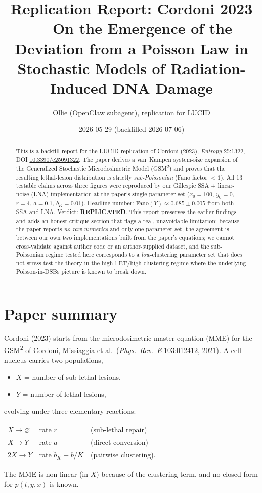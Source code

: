 \documentclass[11pt]{article}
\title{Replication Report: Cordoni 2023 --- On the Emergence of the Deviation from a Poisson Law in Stochastic Models of Radiation-Induced DNA Damage}
\author{Ollie (OpenClaw subagent), replication for LUCID}
\date{2026-05-29 (backfilled 2026-07-06)}
\begin{document}
\maketitle

\begin{abstract}
This is a backfill report for the LUCID replication of Cordoni (2023), \emph{Entropy} 25:1322, DOI \href{https://doi.org/10.3390/e25091322}{10.3390/e25091322}.
The paper derives a van~Kampen system-size expansion of the Generalized Stochastic Microdosimetric Model (GSM\textsuperscript{2}) and proves that the resulting lethal-lesion distribution is strictly \emph{sub-Poissonian} (Fano factor $<1$).  All 13 testable claims across three figures were reproduced by our Gillespie SSA + linear-noise (LNA) implementation at the paper's single parameter set ($x_0=100$, $y_0=0$, $r=4$, $a=0.1$, $\tilde b_K = 0.01$).  Headline number: Fano$(Y)\approx 0.685\pm 0.005$ from both SSA and LNA.  Verdict: \textbf{REPLICATED}.  This report preserves the earlier findings and adds an honest critique section that flags a real, unavoidable limitation: because the paper reports \emph{no raw numerics} and only one parameter set, the agreement is between our own two implementations built from the paper's equations; we cannot cross-validate against author code or an author-supplied dataset, and the sub-Poissonian regime tested here corresponds to a \emph{low}-clustering parameter set that does not stress-test the theory in the high-LET/high-clustering regime where the underlying Poisson-in-DSBs picture is known to break down.
\end{abstract}

\section{Paper summary}

Cordoni (2023) starts from the microdosimetric master equation (MME) for the GSM\textsuperscript{2} of Cordoni, Missiaggia et al.\ (\emph{Phys.\ Rev.\ E} 103:012412, 2021).  A cell nucleus carries two populations,
\begin{itemize}
  \item $X$ = number of sub-lethal lesions,
  \item $Y$ = number of lethal lesions,
\end{itemize}
evolving under three elementary reactions:
\begin{center}
\begin{tabular}{lll}
$X \to \varnothing$ & rate $r$ & (sub-lethal repair) \\
$X \to Y$ & rate $a$ & (direct conversion) \\
$2X \to Y$ & rate $\tilde b_K \equiv b/K$ & (pairwise clustering).
\end{tabular}
\end{center}
The MME is non-linear (in $X$) because of the clustering term, and no closed form for $p(t,y,x)$ is known.
\end{document}
